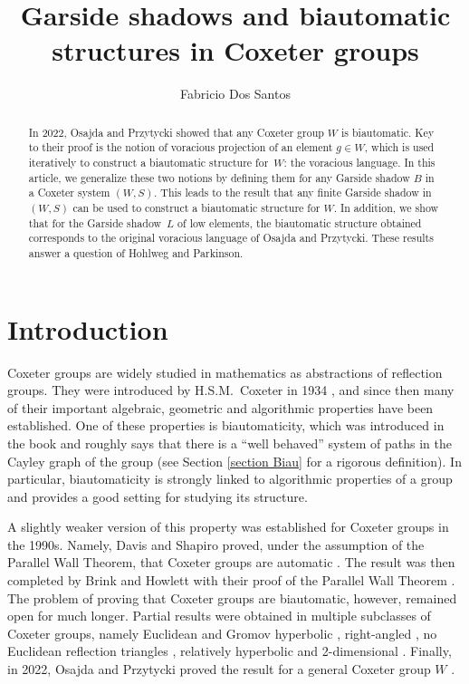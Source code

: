 \documentclass[a4paper,12pt,leqno]{amsart}
\theoremstyle{definition}
\begin{document}
	
	\title{Garside shadows and biautomatic structures in Coxeter groups}
	
	\author[F.~Dos Santos]{Fabricio Dos Santos}

    \address{
		Department of Mathematics and Statistics,
		McGill University,
		Burnside Hall,
		805 Sherbrooke Street West,
		Montreal, QC,
		H3A 0B9, Canada}
	
	\maketitle
	
	\begin{abstract}
		\noindent In 2022, Osajda and Przytycki showed that any Coxeter group $W$ is biautomatic. Key to their proof is the notion of voracious projection of an element $g \in W$, which is used iteratively to construct a biautomatic structure for~$W$: the voracious language. In this article, we generalize these two notions by defining them for any Garside shadow $B$ in a Coxeter system $(W,S)$. This leads to the result that any finite Garside shadow in $(W,S)$ can be used to construct a biautomatic structure for $W$. In addition, we show that for the Garside shadow~$L$ of low elements, the biautomatic structure obtained corresponds to the original voracious language of Osajda and Przytycki. These results answer a question of Hohlweg and Parkinson. 
	\end{abstract}

\section{Introduction}

Coxeter groups are widely studied in mathematics as abstractions of reflection groups. They were introduced by H.S.M.\ Coxeter in 1934 \cite{Coxeter-1934}, and since then many of their important algebraic, geometric and algorithmic properties have been established. One of these properties is biautomaticity, which was introduced in the book \cite{wordprocessing} and roughly says that there is a ``well behaved'' system of paths in the Cayley graph of the group (see Section \ref{section Biau} for a rigorous definition). In particular, biautomaticity is strongly linked to algorithmic properties of a group and provides a good setting for studying its structure. 

A slightly weaker version of this property was established for Coxeter groups in the 1990s. Namely, Davis and Shapiro proved, under the assumption of the Parallel Wall Theorem, that Coxeter groups are automatic \cite{DS-au}. The result was then completed by Brink and Howlett with their proof of the Parallel Wall Theorem \cite{BH-par}. The problem of proving that Coxeter groups are biautomatic, however, remained open for much longer. Partial results were obtained in multiple subclasses of Coxeter groups, namely Euclidean and Gromov hyperbolic \cite{wordprocessing}, right-angled \cite{NR-bi, NR-cox}, no Euclidean reflection triangles \cite{Ba-bi, CM-bi}, relatively hyperbolic \cite{Ca-bi} and 2-dimensional \cite{MOP-bi}. Finally, in 2022, Osajda and Przytycki proved the result for a general Coxeter group $W$ \cite{OP-bi}.
\end{document}
